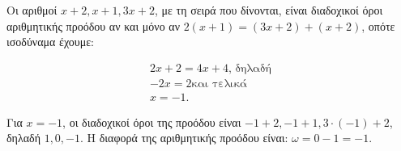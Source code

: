 
\begin{alist}
\item Οι αριθμοί $x + 2, x + 1, 3x + 2$, με τη σειρά που δίνονται, είναι διαδοχικοί όροι
αριθμητικής προόδου αν και μόνο αν $2(x + 1) = (3x + 2) + (x + 2)$, οπότε ισοδύναμα έχουμε:

\begin{gather*}
2x + 2 = 4x + 4\text{, δηλαδή} \\
-2x = 2\text{και τελικά} \\
x = -1.
\end{gather*}

\item Για $x = -1$, οι διαδοχικοί όροι της προόδου είναι $-1 + 2, -1 + 1, 3 \cdot (-1) + 2$, δηλαδή
$1, 0, -1$. Η διαφορά της αριθμητικής προόδου είναι: $\omega = 0 - 1 = -1$.
\end{alist}

